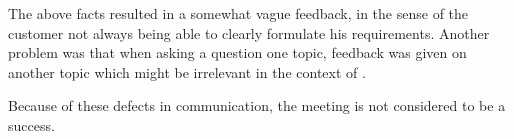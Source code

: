 The above facts resulted in a somewhat vague feedback, in the sense of the customer not always being able to clearly formulate his requirements.
Another problem was that when asking a question one topic, feedback was given on another topic which might be irrelevant in the context of \launcher.

Because of these defects in communication, the meeting is not considered to be a success.